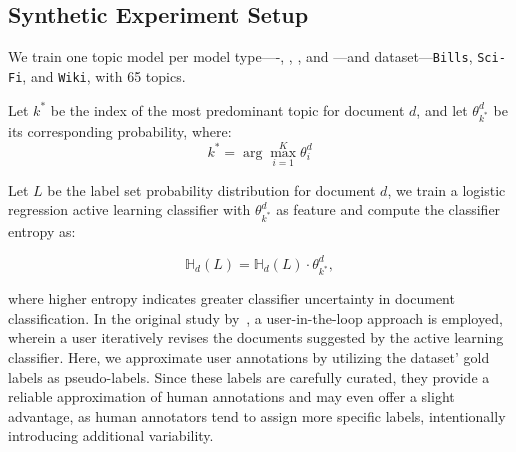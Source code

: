 %

\subsection{Synthetic Experiment Setup}
\label{app:synthetic_experiment_setup}
We train one topic model per model type---\mallet{}-\lda{}, \bertopic{}, \ctm{}, and \dvae{}---and dataset---\texttt{Bills}, \texttt{Sci-Fi}, and \texttt{Wiki}, with 65 topics. 

Let \(k^{*}\) be the index of the most predominant topic for document \(d\), and let \(\theta^d_{k^*}\) be its corresponding probability, where:
\begin{equation}
    k^{*} = \arg \max_{i=1}^{K} \theta_i^d
\end{equation}

Let \(L\) be the label set probability distribution for document \(d\), we train a logistic regression active learning classifier with \(\theta^d_{k^*}\) as feature and compute the classifier entropy as:

\begin{equation}
\mathbb{H}_{d}(L) = \mathbb{H}_d(L) \cdot \theta^d_{k^*},
\label{eq:topic_document_preference}
\end{equation}



where higher entropy indicates greater classifier uncertainty in document classification.
%
In the original study by~\citet{li-etal-2024-improving}, a user-in-the-loop approach is employed, wherein a user iteratively revises the documents suggested by the active learning classifier. Here, we approximate user annotations by utilizing the dataset' gold labels as pseudo-labels. Since these labels are carefully curated, they provide a reliable approximation of human annotations and may even offer a slight advantage, as human annotators tend to assign more specific labels, intentionally introducing additional variability.


